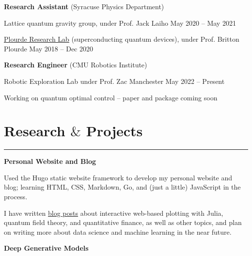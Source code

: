 \documentclass[9pt]{extarticle}
\newcommand{\myline}{\rule[\baselineskip]{\linewidth}{1pt}}
\begin{document}
\vspace{2.5pt}
\large\textbf{Research Assistant} \normalsize (Syracuse Physics Department)
\normalsize

\begin{compactitem}
\item Lattice quantum gravity group, under Prof. Jack Laiho \hfill \small May 2020 -- May 2021 
\normalsize
\item \href{https://bplourde.expressions.syr.edu/}{\underline{Plourde Research Lab}} (superconducting quantum devices), under Prof. Britton Plourde \hfill \small May 2018 -- Dec 2020
\end{compactitem}

\vspace{2.5pt}
\large\textbf{Research Engineer} \normalsize (CMU Robotics Institute)
\normalsize


\begin{compactitem}
\item Robotic Exploration Lab under Prof. Zac Manchester \hfill \small May 2022 -- Present 
\normalsize
\item Working on quantum optimal control -- paper and package coming soon
\normalsize
\end{compactitem}



\section{Research $\&$ Projects}

\myline

\large\textbf{Personal Website and Blog}
\normalsize

\begin{compactitem}
\item Used the Hugo static website framework to develop my personal website and blog; learning HTML, CSS, Markdown, Go, and (just a little) JavaScript in the process. 
\item I have written \href{https://aarontrowbridge.github.io/posts/}{\underline{blog posts}} about interactive web-based plotting with Julia, quantum field theory, and quantitative finance, as well as other topics, and plan on writing more about data science and machine learning in the near future. 
\end{compactitem}

\vspace{2.5pt}
\large\textbf{Deep Generative Models}
\normalsize
\end{document}
